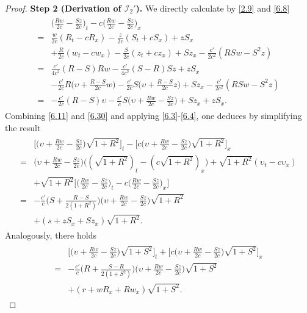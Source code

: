 \documentclass[11pt,reqno]{article}
\newcommand{\fr}{\frac}
\numberwithin{equation}{section}
\begin{document}
\begin{proof}
\textbf{Step 2 (Derivation of $\mathcal{I}_{2}'$).} We directly calculate by \eqref{2.9} and \eqref{6.8}
\begin{align}\label{6.30}
\begin{split}
&\Big(\fr{Rw}{2c}-\fr{Sz}{2c}\Big)_t-c\Big(\fr{Rw}{2c}-\fr{Sz}{2c}\Big)_x \\
=&\fr{w}{2c}(R_t-cR_x)-\fr{z}{2c}(S_t+cS_x) +zS_x \\
&+\fr{R}{2c}(w_t-cw_x) -\fr{S}{2c}(z_t+cz_x) +Sz_x -\fr{c'}{2c^2}(RSw-S^2z) \\
=&\fr{c'}{4c^2}(R-S)Rw -\fr{c'}{4c^2}(S-R)Sz +zS_x \\
&-\fr{c'}{2c}R\Big(\upsilon+\fr{R-S}{2c}w\Big) -\fr{c'}{2c}S\Big(\upsilon+\fr{R-S}{2c}z\Big) +Sz_x-\fr{c'}{2c^2}(RSw-S^2z) \\
=&-\fr{c'}{2c}(R-S)\upsilon -\fr{c'}{c}S\Big(\upsilon+\fr{Rw}{2c}-\fr{Sz}{2c}\Big)+Sz_x+zS_x.
\end{split}
\end{align}
Combining \eqref{6.11} and \eqref{6.30} and applying \eqref{6.3}-\eqref{6.4}, one deduces by
simplifying the result
\begin{align}\label{6.31}
\begin{split}
&\Big[\Big(\upsilon+\fr{Rw}{2c}-\fr{Sz}{2c}\Big)\sqrt{1+R^2}\Big]_t -\Big[c\Big(\upsilon+\fr{Rw}{2c}-\fr{Sz}{2c}\Big)\sqrt{1+R^2}\Big]_x \\
=&\Big(\upsilon+\fr{Rw}{2c}-\fr{Sz}{2c}\Big)\Big((\sqrt{1+R^2})_t-(c\sqrt{1+R^2})_x\Big) +\sqrt{1+R^2}(\upsilon_t-c\upsilon_x) \\ &+\sqrt{1+R^2}\Big[\Big(\fr{Rw}{2c}-\fr{Sz}{2c}\Big)_t-c\Big(\fr{Rw}{2c}-\fr{Sz}{2c}\Big)_x\Big]
 \\
=&-\fr{c'}{c}\Big(S+\fr{R-S}{2(1+R^2)}\Big)\Big(\upsilon+\fr{Rw}{2c}-\fr{Sz}{2c}\Big)\sqrt{1+R^2} \\
&+ (s+zS_x +Sz_x)\sqrt{1+R^2}.
\end{split}
\end{align}
Analogously, there holds
\begin{align}\label{6.32}
\begin{split}
&\Big[\Big(\upsilon+\fr{Rw}{2c}-\fr{Sz}{2c}\Big)\sqrt{1+S^2}\Big]_t +\Big[c\Big(\upsilon+\fr{Rw}{2c}-\fr{Sz}{2c}\Big)\sqrt{1+S^2}\Big]_x \\
=&-\fr{c'}{c}\Big(R+\fr{S-R}{2(1+S^2)}\Big)\Big(\upsilon+\fr{Rw}{2c}-\fr{Sz}{2c}\Big)\sqrt{1+S^2} \\
&+ (r+wR_x +Rw_x)\sqrt{1+S^2}.
\end{split}
\end{align}

\end{proof}
\end{document}
